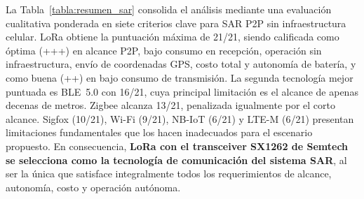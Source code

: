 La Tabla~\ref{tabla:resumen_sar} consolida el análisis mediante una evaluación cualitativa ponderada en siete criterios clave para SAR P2P sin infraestructura celular. LoRa obtiene la puntuación máxima de 21/21, siendo calificada como óptima (+++) en alcance P2P, bajo consumo en recepción, operación sin infraestructura, envío de coordenadas GPS, costo total y autonomía de batería, y como buena (++) en bajo consumo de transmisión. La segunda tecnología mejor puntuada es BLE~5.0 con 16/21, cuya principal limitación es el alcance de apenas decenas de metros. Zigbee alcanza 13/21, penalizada igualmente por el corto alcance. Sigfox (10/21), Wi-Fi (9/21), NB-IoT (6/21) y LTE-M (6/21) presentan limitaciones fundamentales que los hacen inadecuados para el escenario propuesto. En consecuencia, \textbf{LoRa con el transceiver SX1262 de Semtech se selecciona como la tecnología de comunicación del sistema SAR}, al ser la única que satisface integralmente todos los requerimientos de alcance, autonomía, costo y operación autónoma.

\begin{table}[H]
\begin{center}
\caption{Resumen cualitativo de idoneidad para SAR P2P sin infraestructura celular. Escala: \textbf{+++} = Óptimo, \textbf{++} = Bueno, \textbf{+} = Aceptable, \textbf{--} = No apto.}
\label{tabla:resumen_sar}
\end{center}
\end{table}


